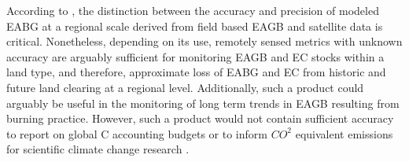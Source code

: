 According to \cite{clarkkellner2012}, the distinction between the accuracy and precision of modeled EABG at a regional scale derived from field based EAGB and satellite data is critical. Nonetheless, depending on its use, remotely sensed metrics with unknown accuracy are arguably sufficient for monitoring EAGB and EC stocks within a land type, and therefore, approximate loss of EABG and EC from historic and future land clearing at a regional level. Additionally, such a product could arguably be useful in the monitoring of long term trends in EAGB resulting from burning practice. However, such a product would not contain sufficient accuracy to report on global C accounting budgets or to inform $CO^2$ equivalent emissions for scientific climate change research \citep{clarkkellner2012, wuetal2016}.